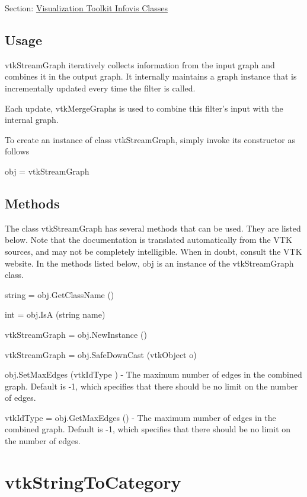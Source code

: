 Section\-: \hyperlink{sec_vtkinfovis}{Visualization Toolkit Infovis Classes} \hypertarget{vtkwidgets_vtkxyplotwidget_Usage}{}\subsection{Usage}\label{vtkwidgets_vtkxyplotwidget_Usage}
vtk\-Stream\-Graph iteratively collects information from the input graph and combines it in the output graph. It internally maintains a graph instance that is incrementally updated every time the filter is called.

Each update, vtk\-Merge\-Graphs is used to combine this filter's input with the internal graph.

To create an instance of class vtk\-Stream\-Graph, simply invoke its constructor as follows \begin{DoxyVerb}  obj = vtkStreamGraph
\end{DoxyVerb}
 \hypertarget{vtkwidgets_vtkxyplotwidget_Methods}{}\subsection{Methods}\label{vtkwidgets_vtkxyplotwidget_Methods}
The class vtk\-Stream\-Graph has several methods that can be used. They are listed below. Note that the documentation is translated automatically from the V\-T\-K sources, and may not be completely intelligible. When in doubt, consult the V\-T\-K website. In the methods listed below, {\ttfamily obj} is an instance of the vtk\-Stream\-Graph class. 
\begin{DoxyItemize}
\item {\ttfamily string = obj.\-Get\-Class\-Name ()}  
\item {\ttfamily int = obj.\-Is\-A (string name)}  
\item {\ttfamily vtk\-Stream\-Graph = obj.\-New\-Instance ()}  
\item {\ttfamily vtk\-Stream\-Graph = obj.\-Safe\-Down\-Cast (vtk\-Object o)}  
\item {\ttfamily obj.\-Set\-Max\-Edges (vtk\-Id\-Type )} -\/ The maximum number of edges in the combined graph. Default is -\/1, which specifies that there should be no limit on the number of edges.  
\item {\ttfamily vtk\-Id\-Type = obj.\-Get\-Max\-Edges ()} -\/ The maximum number of edges in the combined graph. Default is -\/1, which specifies that there should be no limit on the number of edges.  
\end{DoxyItemize}\hypertarget{vtkinfovis_vtkstringtocategory}{}\section{vtk\-String\-To\-Category}\label{vtkinfovis_vtkstringtocategory}
